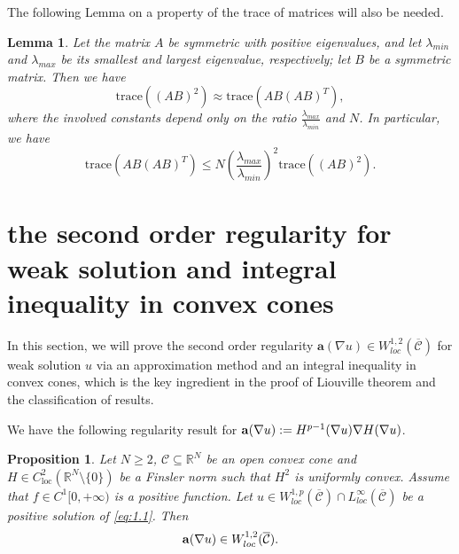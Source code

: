 \documentclass[12pt]{amsart}
\newtheorem{lem}[thm]{Lemma}
\newtheorem{prop}[thm]{Proposition}
\theoremstyle{definition}
\theoremstyle{remark}
\theoremstyle{conclusion}
\theoremstyle{conjecture}
\numberwithin{equation}{section}
\begin{document}
The following Lemma on a property of the trace of matrices will also be needed.

\begin{lem}\cite[Lemma 4.5]{AKM}\label{le:2.9}
    Let the matrix $A$ be symmetric with positive eigenvalues, and let $\lambda_{min}$ and $\lambda_{max}$ be its smallest and largest eigenvalue, respectively;
     let $B$ be a symmetric matrix. Then we have
     \begin{equation*}
        \mathrm{trace}((AB)^2)\approx  \mathrm{trace}(AB(AB)^T),
     \end{equation*}
     where the involved constants depend only on the ratio $\frac{\lambda_{max}}{\lambda_{min}}$ and $N$. In particular, we have
     \begin{equation*}
        \mathrm{trace}(AB(AB)^T)\leq N\left(\frac{\lambda_{max}}{\lambda_{min}}\right) ^2  \mathrm{trace}((AB)^2).
     \end{equation*}
\end{lem}

\section{the second order regularity for weak solution and integral inequality in convex cones}
In this section, we will prove the second order regularity $\mathbf{a}(\nabla u)\in W^{1,2}_{loc}(\overline{\mathcal{C}})$ for weak solution $u$ via an approximation method and an integral inequality in convex cones, which is the key ingredient in the proof of Liouville theorem and the classification of results.

\smallskip

We have the following regularity result for ${\bf{a}}(\nabla u):=H^{p-1}(\nabla u)\nabla H(\nabla u)$.
\begin{prop}\label{regular}
Let $N\geq2$, $\mathcal{C}\subseteq\mathbb{R}^{N}$ be an open convex cone and $H\in C^{2}_{\text{loc}}(\mathbb{R}^{N}\setminus\{0\})$ be a Finsler norm such that $H^{2}$ is uniformly convex. Assume that $f\in C^1[0,+\infty)$ is a positive function. Let $u\in W^{1,p}_{loc}(\overline{\mathcal{C}})\cap L^{\infty}_{loc}(\overline{\mathcal{C}})$ be a positive solution of \eqref{eq:1.1}. Then
$${\bf{a}}(\nabla u)\in W^{1,2}_{loc}(\overline{\mathcal{C}}).$$
\end{prop}
\end{document}
